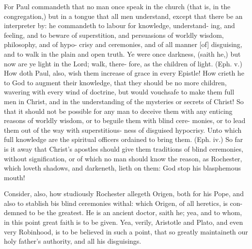 \documentclass{custom}
\begin{document}
For Paul commandeth that no man once speak in the 
church (that is, in the congregation,) but in a tongue that all 
men understand, except that there be an interpreter by: 
he commandeth to labour for knowledge, understand- 
ing, and feeling, and to beware of superstition, and 
persuasions of worldly wisdom, philosophy, and of hypo- 
crisy and ceremonies, and of all manner [of] disguising, and 
to walk in the plain and open truth. Ye were once darkness, 
(saith he,) but now are ye light in the Lord; walk, there- 
fore, as the children of light. (Eph. v.) How doth Paul, 
also, wish them increase of grace in every Epistle! How 
crieth he to God to augment their knowledge, that they 
should be no more children, wavering with every wind of 
doctrine, but would vouchsafe to make them full men in 
Christ, and in the understanding of the mysteries or 
secrets of Christ! So that it should not be possible for 
any man to deceive them with any enticing reasons of 
worldly wisdom, or to beguile them with blind cere- 
monies, or to lead them out of the way with superstitious- 
ness of disguised hypocrisy. Unto which full knowledge 
are the spiritual officers ordained to bring them. (Eph. iv.) 
So far is it away that Christ's apostles should give them 
traditions of blind ceremonies, without signification, or of 
which no man should know the reason, as Rochester, 
which loveth shadows, and darkeneth, lieth on them: God 
stop his blasphemous mouth! 

Consider, also, how studiously Rochester allegeth 
Origen, both for his Pope, and also to stablish bis blind 
ceremonies withal: which Origen, of all heretics, is con- 
demned to be the greatest. He is an ancient doctor, 
saith he; yea, and to whom, in this point great faith is to 
be given. Yea, verily, Aristotle and Plato, and even very 
Robinhood, is to be believed in such a point, that so 
greatly maintaineth our holy father's authority, and all his 
disguisings. 
\end{document}
